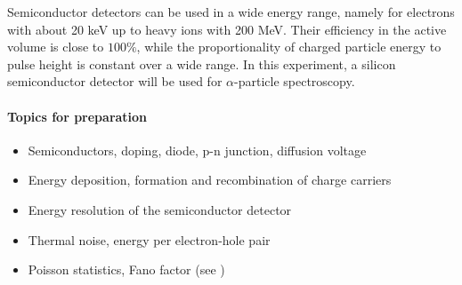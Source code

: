 \hfill
\hfill

Semiconductor detectors can be used in a wide energy range, namely for electrons with about 20 keV up to heavy ions with 200 MeV. Their efficiency in the active volume is close to $100\%$, while the proportionality of charged particle energy to pulse height is constant over a wide range. In this experiment, a silicon semiconductor detector will be used for $\alpha$-particle spectroscopy.
\paragraph{Topics for preparation}
\begin{itemize}
	\item Semiconductors, doping, diode, p-n junction, diffusion voltage
	\item Energy deposition, formation and recombination of charge carriers
	\item Energy resolution of the semiconductor detector
	\item Thermal noise, energy per electron-hole pair
	\item Poisson statistics, Fano factor (see \cite[Kap. 17.10.2]{kolanoski})
\end{itemize}
